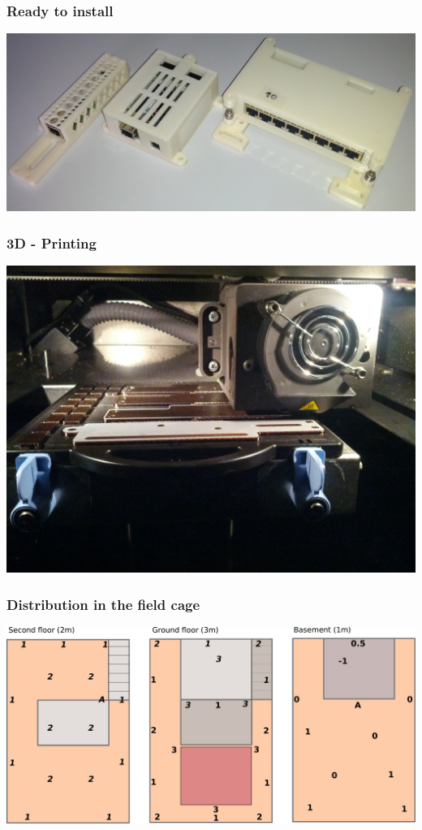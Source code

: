 \documentclass[t]{beamer}
\begin{document}
\begin{frame}[c]
    \frametitle{Ready to install}
  \begin{center}
  	\includegraphics[width=0.9\linewidth]{img/pic/cases.jpg}\\
  \vspace{0.5cm}
  \end{center}
\end{frame}
\begin{frame}[c]
    \frametitle{3D - Printing}
  \begin{center}
  	\includegraphics[width=0.8\linewidth]{img/pic/IMG_20140530_184940.jpg}\\
  \vspace{0.5cm}
  \end{center}
\end{frame}
\begin{frame}[c]
    \frametitle{Distribution in the field cage}
  \begin{center}
  	\includegraphics[width=0.9\linewidth]{img/installPlan.pdf}\\
  \vspace{0.5cm}
  \end{center}
\end{frame}
\end{document}
